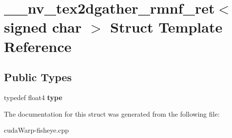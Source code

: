 \hypertarget{struct____nv__tex2dgather__rmnf__ret_3_01signed_01char_01_4}{}\section{\+\_\+\+\_\+nv\+\_\+tex2dgather\+\_\+rmnf\+\_\+ret$<$ signed char $>$ Struct Template Reference}
\label{struct____nv__tex2dgather__rmnf__ret_3_01signed_01char_01_4}
\subsection*{Public Types}
\begin{DoxyCompactItemize}
\item 
typedef float4 {\bfseries type}\hypertarget{struct____nv__tex2dgather__rmnf__ret_3_01signed_01char_01_4_ac49f3f2d07148dfe354bff957d8380e1}{}\label{struct____nv__tex2dgather__rmnf__ret_3_01signed_01char_01_4_ac49f3f2d07148dfe354bff957d8380e1}

\end{DoxyCompactItemize}


The documentation for this struct was generated from the following file\+:\begin{DoxyCompactItemize}
\item 
cuda\+Warp-\/fisheye.\+cpp\end{DoxyCompactItemize}

